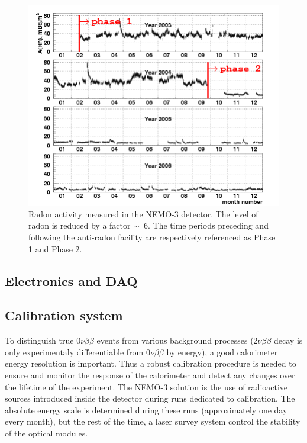 \documentclass[main.tex]{subfiles}
\begin{document}
 
\begin{figure}[h!]
\begin{center}
\includegraphics[scale=0.6]{pictures/Chap3/rn_bytime.png}
\caption{Radon activity measured in the NEMO-3 detector. The level of radon is reduced by a factor $\sim$~6. The time periods preceding and following the anti-radon facility are respectively referenced as Phase 1 and Phase 2.}
\label{RadonByTime}
\end{center}
\end{figure}


\FloatBarrier


\subsection{Electronics and DAQ}


\subsection{Calibration system}

\NI To distinguish true 0$\nu\beta\beta$ events from various background processes (2$\nu\beta\beta$ decay is only experimentaly differentiable from 0$\nu\beta\beta$ by energy), a good calorimeter energy resolution is important. Thus a robust calibration procedure is needed to ensure and monitor the response of the calorimeter and detect any changes over the lifetime of the experiment. The NEMO-3 solution is the use of radioactive sources introduced inside the detector during runs dedicated to calibration. The absolute energy scale is determined during these runs (approximately one day every month), but the rest of the time, a laser survey system control the stability of the optical modules. 
\end{document}

